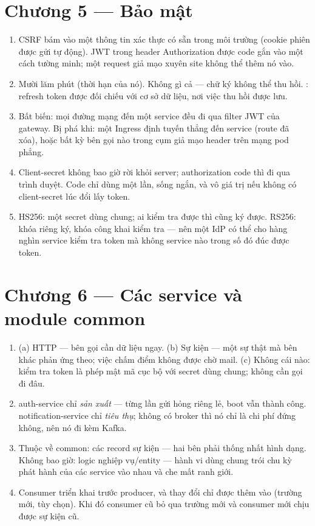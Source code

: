 \section*{Chương 5 --- Bảo mật}
\begin{enumerate}
  \item CSRF bám vào một thông tin xác thực có sẵn trong môi trường
  (cookie phiên được gửi tự động). JWT trong header Authorization được
  code gắn vào một cách tường minh; một request giả mạo xuyên site
  không thể thêm nó vào.
  \item Mười lăm phút (thời hạn của nó). Không gì cả --- chữ ký không
  thể thu hồi. : refresh token được đối chiếu với cơ sở
  dữ liệu, nơi việc thu hồi được lưu.
  \item Bất biến: mọi đường mạng đến một service đều đi qua filter JWT
  của gateway. Bị phá khi: một Ingress định tuyến thẳng đến service
  (route  đã xóa), hoặc bất kỳ bên gọi nào trong cụm
  giả mạo header trên mạng pod phẳng.
  \item Client-secret không bao giờ rời khỏi server; authorization
  code thì đi qua trình duyệt. Code chỉ dùng một lần, sống ngắn, và vô
  giá trị nếu không có client-secret lúc đổi lấy token.
  \item HS256: một secret dùng chung; ai kiểm tra được thì cũng ký
  được. RS256: khóa riêng ký, khóa công khai kiểm tra --- nên một IdP
  có thể cho hàng nghìn service kiểm tra token mà không service nào
  trong số đó đúc được token.
\end{enumerate}

\section*{Chương 6 --- Các service và module common}
\begin{enumerate}
  \item (a) HTTP --- bên gọi cần dữ liệu ngay. (b) Sự kiện --- một sự
  thật mà bên khác phản ứng theo; việc chấm điểm không được chờ mail.
  (c) Không cái nào: kiểm tra token là phép mật mã cục bộ với secret
  dùng chung; không cần gọi đi đâu.
  \item auth-service chỉ \emph{sản xuất} --- từng lần gửi hỏng riêng
  lẻ, boot vẫn thành công. notification-service chỉ \emph{tiêu thụ};
  không có broker thì nó chỉ là chi phí đứng không, nên nó đi kèm
  Kafka.
  \item Thuộc về common: các record sự kiện --- hai bên phải thống nhất
  hình dạng. Không bao giờ: logic nghiệp vụ/entity --- hành vi dùng
  chung trói chu kỳ phát hành của các service vào nhau và che mất ranh
  giới.
  \item Consumer triển khai trước producer, và thay đổi chỉ được thêm
  vào (trường mới, tùy chọn). Khi đó consumer cũ bỏ qua trường mới và
  consumer mới chịu được sự kiện cũ.
\end{enumerate}

